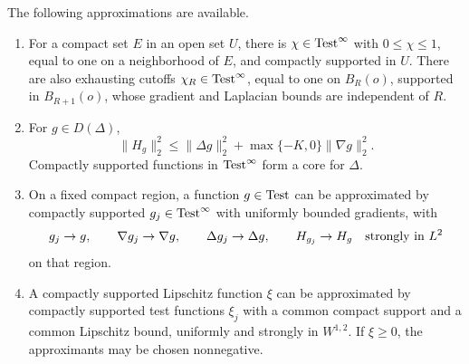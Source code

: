 \begin{lemma}
\label{pre:approximation}
The following approximations are available.
\begin{enumerate}
\item For a compact set \(E\) in an open set \(U\), there is
\(\chi\in\operatorname{Test}^\infty\) with \(0\le\chi\le1\), equal to one on a
neighborhood of \(E\), and compactly supported in \(U\).
There are also exhausting cutoffs \(\chi_R\in\operatorname{Test}^\infty\),
equal to one on \(B_R(o)\), supported in \(B_{R+1}(o)\), whose
gradient and Laplacian bounds are independent of \(R\).
\item For \(g\in D(\Delta)\),
\begin{equation}
\label{eq:pre-hessian-estimate}
\|H_g\|_2^2\le
\|\Delta g\|_2^2+\max\{-K,0\}\|\nabla g\|_2^2.
\end{equation}
Compactly supported functions in \(\operatorname{Test}^\infty\) form a core
for \(\Delta\).
\item On a fixed compact region, a function \(g\in\operatorname{Test}\) can be
approximated by compactly supported \(g_j\in\operatorname{Test}^\infty\) with
uniformly bounded gradients, with
\[
g_j\to g,\qquad \nabla g_j\to\nabla g,\qquad
\Delta g_j\to\Delta g,\qquad H_{g_j}\to H_g
\quad\hbox{strongly in }L^2
\]
on that region.
\item A compactly supported Lipschitz function \(\xi\) can be
approximated by compactly supported test functions \(\xi_j\)
with a common compact support and a common Lipschitz bound,
uniformly and strongly in \(W^{1,2}\).
If \(\xi\ge0\), the approximants may be chosen nonnegative.
\end{enumerate}
\end{lemma}


